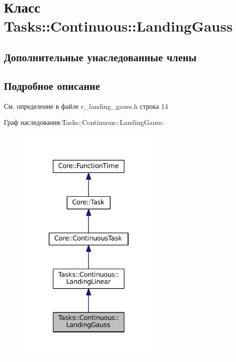 \hypertarget{class_tasks_1_1_continuous_1_1_landing_gauss}{}\section{Класс Tasks\+:\+:Continuous\+:\+:Landing\+Gauss}
\label{class_tasks_1_1_continuous_1_1_landing_gauss}
\subsection*{Дополнительные унаследованные члены}


\subsection{Подробное описание}


См. определение в файле c\+\_\+landing\+\_\+gauss.\+h строка 14



Граф наследования\+:Tasks\+:\+:Continuous\+:\+:Landing\+Gauss\+:
\nopagebreak
\begin{figure}[H]
\begin{center}
\leavevmode
\includegraphics[width=202pt]{class_tasks_1_1_continuous_1_1_landing_gauss__inherit__graph}
\end{center}
\end{figure}


